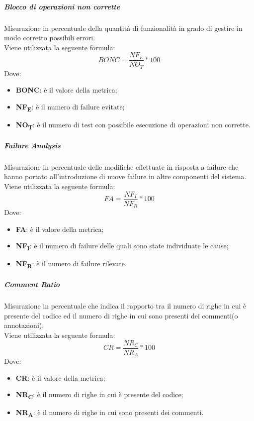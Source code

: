 \subparagraph{Blocco di operazioni non corrette}\Spazio
Misurazione in percentuale della quantità di funzionalità in grado di gestire in modo corretto possibili errori.\\
Viene utilizzata la seguente formula:
$$BONC=\frac{NF_E}{NO_T}*100$$
Dove:
\begin{itemize}
	\item{\textbf{BONC}: è il valore della metrica;}
	\item{\textbf{NF\textsubscript{E}}: è il numero di failure evitate;}
	\item{\textbf{NO\textsubscript{T}}: è il numero di test con possibile esecuzione di operazioni non corrette.}
\end{itemize}

\subparagraph{Failure Analysis}\Spazio
Misurazione in percentuale delle modifiche effettuate in risposta a failure che hanno portato all'introduzione di nuove failure in altre componenti del sistema. \\
Viene utilizzata la seguente formula:
$$FA=\frac{NF_I}{NF_R}*100$$
Dove:
\begin{itemize}
	\item{\textbf{FA}: è il valore della metrica;}
	\item{\textbf{NF\textsubscript{I}}: è il numero di failure delle quali sono state individuate le cause;}
	\item{\textbf{NF\textsubscript{R}}: è il numero di failure rilevate.}
\end{itemize}

\subparagraph{Comment Ratio}\Spazio
Misurazione in percentuale che indica il rapporto tra il numero di righe in cui è presente del codice ed il numero di righe in cui sono presenti dei commenti(o annotazioni). \\
Viene utilizzata la seguente formula:
$$CR=\frac{NR_C}{NR_A}*100$$
Dove:
\begin{itemize}
	\item{\textbf{CR}: è il valore della metrica;}
	\item{\textbf{NR\textsubscript{C}}: è il numero di righe in cui è presente del codice;}
	\item{\textbf{NR\textsubscript{A}}: è il numero di righe in cui sono presenti dei commenti.}
\end{itemize}

\pagebreak
